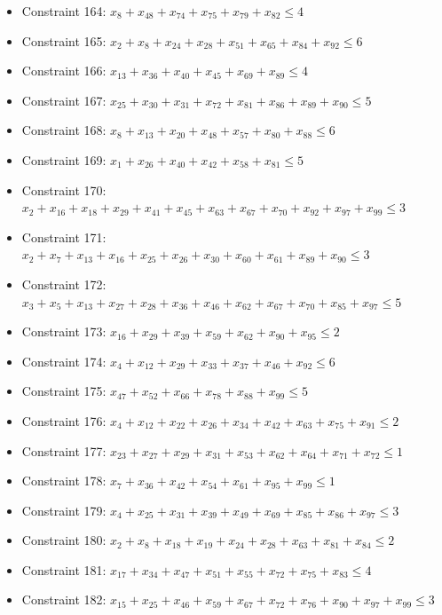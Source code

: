 \documentclass[11pt]{article}
\begin{document}
\begin{itemize}
\item Constraint 164: $x_{8} + x_{48} + x_{74} + x_{75} + x_{79} + x_{82} \le 4$
\item Constraint 165: $x_{2} + x_{8} + x_{24} + x_{28} + x_{51} + x_{65} + x_{84} + x_{92} \le 6$
\item Constraint 166: $x_{13} + x_{36} + x_{40} + x_{45} + x_{69} + x_{89} \le 4$
\item Constraint 167: $x_{25} + x_{30} + x_{31} + x_{72} + x_{81} + x_{86} + x_{89} + x_{90} \le 5$
\item Constraint 168: $x_{8} + x_{13} + x_{20} + x_{48} + x_{57} + x_{80} + x_{88} \le 6$
\item Constraint 169: $x_{1} + x_{26} + x_{40} + x_{42} + x_{58} + x_{81} \le 5$
\item Constraint 170: $x_{2} + x_{16} + x_{18} + x_{29} + x_{41} + x_{45} + x_{63} + x_{67} + x_{70} + x_{92} + x_{97} + x_{99} \le 3$
\item Constraint 171: $x_{2} + x_{7} + x_{13} + x_{16} + x_{25} + x_{26} + x_{30} + x_{60} + x_{61} + x_{89} + x_{90} \le 3$
\item Constraint 172: $x_{3} + x_{5} + x_{13} + x_{27} + x_{28} + x_{36} + x_{46} + x_{62} + x_{67} + x_{70} + x_{85} + x_{97} \le 5$
\item Constraint 173: $x_{16} + x_{29} + x_{39} + x_{59} + x_{62} + x_{90} + x_{95} \le 2$
\item Constraint 174: $x_{4} + x_{12} + x_{29} + x_{33} + x_{37} + x_{46} + x_{92} \le 6$
\item Constraint 175: $x_{47} + x_{52} + x_{66} + x_{78} + x_{88} + x_{99} \le 5$
\item Constraint 176: $x_{4} + x_{12} + x_{22} + x_{26} + x_{34} + x_{42} + x_{63} + x_{75} + x_{91} \le 2$
\item Constraint 177: $x_{23} + x_{27} + x_{29} + x_{31} + x_{53} + x_{62} + x_{64} + x_{71} + x_{72} \le 1$
\item Constraint 178: $x_{7} + x_{36} + x_{42} + x_{54} + x_{61} + x_{95} + x_{99} \le 1$
\item Constraint 179: $x_{4} + x_{25} + x_{31} + x_{39} + x_{49} + x_{69} + x_{85} + x_{86} + x_{97} \le 3$
\item Constraint 180: $x_{2} + x_{8} + x_{18} + x_{19} + x_{24} + x_{28} + x_{63} + x_{81} + x_{84} \le 2$
\item Constraint 181: $x_{17} + x_{34} + x_{47} + x_{51} + x_{55} + x_{72} + x_{75} + x_{83} \le 4$
\item Constraint 182: $x_{15} + x_{25} + x_{46} + x_{59} + x_{67} + x_{72} + x_{76} + x_{90} + x_{97} + x_{99} \le 3$

\end{itemize}
\end{document}

